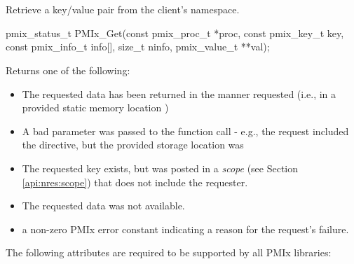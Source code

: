 \section{}

\summary

Retrieve a key/value pair from the client's namespace.

\format

\cspecificstart
\begin{codepar}
pmix_status_t
PMIx_Get(const pmix_proc_t *proc, const pmix_key_t key,
         const pmix_info_t info[], size_t ninfo,
         pmix_value_t **val);
\end{codepar}
\cspecificend

\begin{arglist}
\end{arglist}

Returns one of the following:

\begin{itemize}
\item {} The requested data has been returned in the manner requested (i.e., in a provided static memory location )
\item {} A bad parameter was passed to the function call - e.g., the request included the  directive, but the provided storage location was 
\item {} The requested key exists, but was posted in a \emph{scope} (see Section \ref{api:nres:scope}) that does not include the requester.
\item {} The requested data was not available.
\item a non-zero \ac{PMIx} error constant indicating a reason for the request's failure.
\end{itemize}

\reqattrstart
The following attributes are required to be supported by all \ac{PMIx} libraries:

